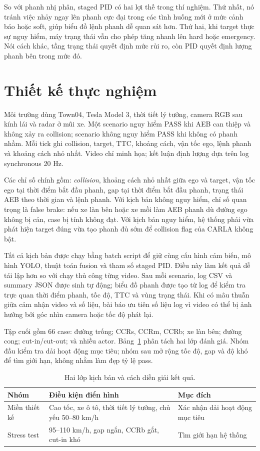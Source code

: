 \documentclass[conference]{IEEEtran}
\begin{document}
So với phanh nhị phân, staged PID có hai lợi thế trong thí nghiệm. Thứ nhất, nó tránh việc nhảy ngay lên phanh cực đại trong các tình huống mới ở mức cảnh báo hoặc soft, giúp biểu đồ lệnh phanh dễ quan sát hơn. Thứ hai, khi target thực sự nguy hiểm, máy trạng thái vẫn cho phép tăng nhanh lên hard hoặc emergency. Nói cách khác, tầng trạng thái quyết định mức rủi ro, còn PID quyết định lượng phanh bên trong mức đó.

\section{Thiết kế thực nghiệm}
Môi trường dùng Town04, Tesla Model 3, thời tiết lý tưởng, camera RGB sau kính lái và radar ở mũi xe. Một scenario nguy hiểm PASS khi AEB can thiệp và không xảy ra collision; scenario không nguy hiểm PASS khi không có phanh nhầm. Mỗi tick ghi collision, target, TTC, khoảng cách, vận tốc ego, lệnh phanh và khoảng cách nhỏ nhất. Video chỉ minh họa; kết luận định lượng dựa trên log synchronous 20 Hz.

Các chỉ số chính gồm: \textit{collision}, khoảng cách nhỏ nhất giữa ego và target, vận tốc ego tại thời điểm bắt đầu phanh, gap tại thời điểm bắt đầu phanh, trạng thái AEB theo thời gian và lệnh phanh. Với kịch bản không nguy hiểm, chỉ số quan trọng là false brake: nếu xe làn bên hoặc xe mồi làm AEB phanh dù đường ego không bị cản, case bị tính không đạt. Với kịch bản nguy hiểm, hệ thống phải vừa phát hiện target đúng vừa tạo phanh đủ sớm để collision flag của CARLA không bật.

Tất cả kịch bản được chạy bằng batch script để giữ cùng cấu hình cảm biến, mô hình YOLO, thuật toán fusion và tham số staged PID. Điều này làm kết quả dễ tái lập hơn so với chạy thủ công từng video. Sau mỗi scenario, log CSV và summary JSON được sinh tự động; biểu đồ phanh được tạo từ log để kiểm tra trực quan thời điểm phanh, tốc độ, TTC và vùng trạng thái. Khi có mâu thuẫn giữa cảm nhận video và số liệu, bài báo ưu tiên số liệu log vì video có thể bị ảnh hưởng bởi góc nhìn camera hoặc tốc độ phát lại.

Tập cuối gồm 66 case: đường trống; CCRs, CCRm, CCRb; xe làn bên; đường cong; cut-in/cut-out; và nhiều actor. Bảng~\ref{tab:scope} phân tách hai lớp đánh giá. Nhóm đầu kiểm tra dải hoạt động mục tiêu; nhóm sau mở rộng tốc độ, gap và độ khó để tìm giới hạn, không nhằm làm đẹp tỷ lệ pass.

\begin{table}[t]
\caption{Hai lớp kịch bản và cách diễn giải kết quả.}
\label{tab:scope}
\centering
\footnotesize
\begin{tabular}{p{}p{}p{}}
\toprule
Nhóm & Điều kiện điển hình & Mục đích \\
\midrule
Miền thiết kế & Cao tốc, xe ô tô, thời tiết lý tưởng, chủ yếu 50--80 km/h & Xác nhận dải hoạt động mục tiêu \\
Stress test & 95--110 km/h, gap ngắn, CCRb gắt, cut-in khó & Tìm giới hạn hệ thống \\
\bottomrule
\end{tabular}
\end{table}
\end{document}
